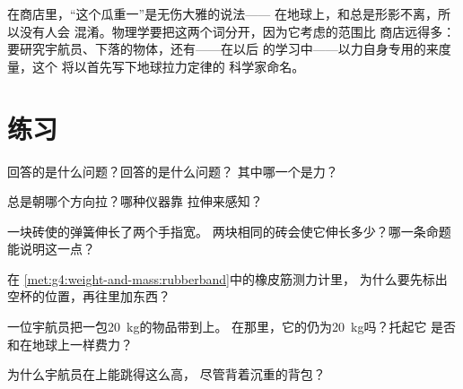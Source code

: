 \begin{remark}[日常用语与物理用语]\label{rem:g4:weight-and-mass:words}
在商店里，“这个瓜重一”是无伤大雅的说法——
在地球上，和总是形影不离，所以没有人会
混淆。物理学要把这两个词分开，因为它考虑的范围比
商店远得多：要研究宇航员、下落的物体，还有——在以后
的学习中——以力自身专用的来度量，这个
将以首先写下地球拉力定律的
科学家命名。
\end{remark}

\section{练习}

\begin{exercise}[$\star$]\label{exo:g4:weight-and-mass:1}
回答的是什么问题？回答的是什么问题？
其中哪一个是力？
\end{exercise}

\begin{exercise}[$\star$]\label{exo:g4:weight-and-mass:2}
总是朝哪个方向拉？哪种仪器靠
拉伸来感知？
\end{exercise}

\begin{exercise}[$\star$]\label{exo:g4:weight-and-mass:3}
一块砖使的弹簧伸长了两个手指宽。
两块相同的砖会使它伸长多少？哪一条命题
能说明这一点？
\end{exercise}

\begin{exercise}[$\star$]\label{exo:g4:weight-and-mass:4}
在
\cref{met:g4:weight-and-mass:rubberband}中的橡皮筋测力计里，
为什么要先标出空杯的位置，再往里加东西？
\end{exercise}

\begin{exercise}[$\star$]\label{exo:g4:weight-and-mass:5}
一位宇航员把一包\qty{20}{kg}的物品带到上。
在那里，它的仍为\qty{20}{kg}吗？托起它
是否和在地球上一样费力？
\end{exercise}

\begin{exercise}[$\star$]\label{exo:g4:weight-and-mass:6}
为什么宇航员在上能跳得这么高，
尽管背着沉重的背包？
\end{exercise}

